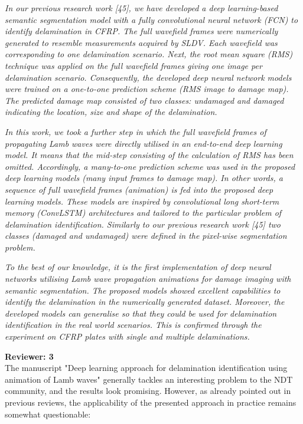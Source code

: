 \documentclass[11pt,a2paper]{report}
\begin{document}
	\emph{In our previous research work [45], we have developed a deep learning-based
		semantic segmentation model with a fully convolutional neural network (FCN)
		to identify delamination in CFRP.	
		The full wavefield frames were
numerically generated to resemble measurements acquired by SLDV.
		Each wavefield was corresponding to one delamination scenario.
		Next, the root mean square (RMS) technique
was applied on the full wavefield frames giving one image per delamination scenario.
		Consequently,
the developed deep neural network models were trained on a one-to-one prediction scheme (RMS image to damage map).
	    The predicted damage map consisted of two classes: undamaged and damaged indicating the location, size and shape of the delamination.}
	
		\emph{In this work, we took a further step in which the full wavefield frames of
		propagating Lamb waves were directly utilised in an end-to-end
deep learning model.
		It means that the mid-step consisting of the calculation of RMS has been omitted.
		Accordingly, a many-to-one
prediction scheme was used in the proposed deep learning models (many input frames to damage map).
		In other words, a sequence of full wavefield frames (animation) is fed into the proposed deep learning models.
		These models are inspired by convolutional long short-term memory (ConvLSTM) architectures and tailored to the particular problem of delamination identification.
		Similarly to our previous research work [45] two classes (damaged and undamaged) were defined in the pixel-wise segmentation problem.}
	
	    \emph{To the best of our knowledge, it is the first
implementation of deep neural networks utilising Lamb wave propagation animations
for damage imaging with semantic segmentation. 
	    The proposed models
showed excellent capabilities to identify the delamination in the numerically
generated dataset.
	    Moreover, the developed models can generalise so that they could be used for delamination
identification in the real world scenarios.
    	This is confirmed through the experiment on CFRP plates with single and multiple delaminations.}
    
	\newpage
	\textbf{Reviewer: 3} \\
	The manuscript "Deep learning approach for delamination identification using animation of Lamb waves" generally tackles an interesting problem to the NDT community, and the results look promising. 
	However, as already pointed out in previous reviews, the applicability of the presented approach in practice remains somewhat questionable: 
	
\end{document}
